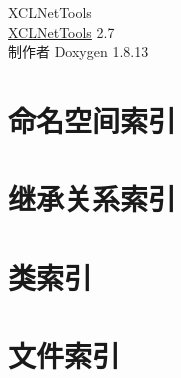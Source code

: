 \documentclass[twoside]{book}
\newcommand{\+}{\discretionary{\mbox{\scriptsize$\hookleftarrow$}}{}{}}
\newcommand{\clearemptydoublepage}{%
  \newpage{\pagestyle{empty}\cleardoublepage}%
}
\begin{document}
\hypersetup{pageanchor=false,
             bookmarksnumbered=true,
             pdfencoding=unicode
            }
\begin{titlepage}
\vspace*{7cm}
\begin{center}%
{\Large X\+C\+L\+Net\+Tools \\[1ex]\large \hyperlink{namespace_x_c_l_net_tools}{X\+C\+L\+Net\+Tools} 2.\+7 }\\
\vspace*{1cm}
{\large 制作者 Doxygen 1.8.13}\\
\end{center}
\end{titlepage}
\clearemptydoublepage
{}
\tableofcontents
\clearemptydoublepage
{}
\hypersetup{pageanchor=true}

\chapter{命名空间索引}

\chapter{继承关系索引}

\chapter{类索引}

\chapter{文件索引}

\end{document}
